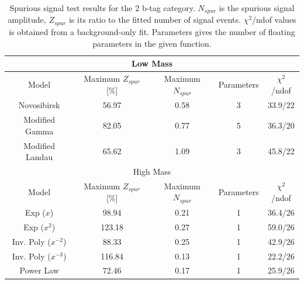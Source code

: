 \begin{table}[!h]
  \centering
  \caption[Spurious signal test results for the 2 b-tag category]{Spurious signal test results for the 2 b-tag category. $N_{spur}$ is the spurious signal amplitude, $Z_{spur}$ is its ratio to the fitted number of signal events. $\chi^2$/ndof values is obtained from a background-only fit. Parameters gives the number of floating parameters in the given function.}
  \label{tab:spurious-signal-2}
  \begin{tabular}{|c|c|c|c|c|}
    \hline
    \multicolumn{5}{|c|}{Low Mass}\\
    \hline
    Model     &   Maximum $Z_{spur}$ [\%]      &      Maximum $N_{spur}$      &   Parameters     &    $\chi^2$/ndof \\
    \hline
    Novosibirsk        & 56.97    &  0.58   & 3  & 33.9/22 \\
    Modified Gamma     & 82.05    &  0.77   & 5  & 36.3/20 \\
    Modified Landau    & 65.62    &  1.09   & 3  & 45.8/22 \\
    \hline
    \multicolumn{5}{|c|}{High Mass}\\
    \hline
    Model     &   Maximum $Z_{spur}$ [\%]      &      Maximum $N_{spur}$      &   Parameters     &    $\chi^2$/ndof \\
    \hline
    Exp ($x$)             &  98.94   & 0.21   & 1  & 36.4/26 \\
    Exp ($x^2$)           &  123.18   & 0.27   & 1  & 59.0/26 \\
    Inv. Poly ($x^{-2}$)    &  88.33   & 0.25   & 1  & 42.9/26 \\
    Inv. Poly ($x^{-3}$)    &  116.84   & 0.13   & 1  & 22.2/26 \\
    Power Law             &  72.46   & 0.17   & 1  & 25.9/26 \\
    \hline    
  \end{tabular}
\end{table}


